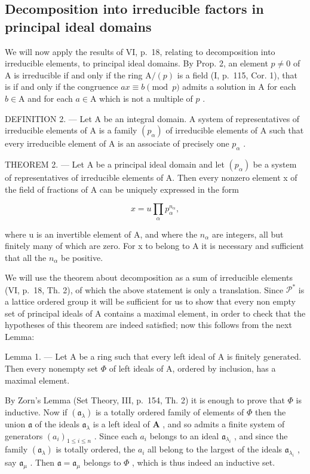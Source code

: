 \subsection{Decomposition into irreducible factors in principal ideal domains}

We will now apply the results of VI, p.~18, relating to decomposition into irreducible elements, to principal ideal domains. By Prop. 2, an element \(p \neq 0\) of A is irreducible if and only if the ring \(\mathrm{A}/(p)\) is a field (I, p.~115, Cor. 1), that is if and only if the congruence \(ax \equiv b \pmod{p}\) admits a solution in A for each \(b \in \mathrm{A}\) and for each \(a \in \mathrm{A}\) which is not a multiple of \(p\) .

DEFINITION 2. --- Let A be an integral domain. A system of representatives of irreducible elements of A is a family \((p_{\alpha})\) of irreducible elements of A such that every irreducible element of A is an associate of precisely one \(p_{\alpha}\) .

THEOREM 2. --- Let A be a principal ideal domain and let \((p_{\alpha})\) be a system of representatives of irreducible elements of A. Then every nonzero element x of the field of fractions of A can be uniquely expressed in the form

\[
x = u \prod_ {\alpha} p _ {\alpha} ^ {n _ {\alpha}},\tag{1}
\]

where u is an invertible element of A, and where the \(n_{\alpha}\) are integers, all but finitely many of which are zero. For x to belong to A it is necessary and sufficient that all the \(n_{\alpha}\) be positive.

We will use the theorem about decomposition as a sum of irreducible elements (VI, p.~18, Th. 2), of which the above statement is only a translation. Since \(\mathcal{P}^*\) is a lattice ordered group it will be sufficient for us to show that every non empty set of principal ideals of A contains a maximal element, in order to check that the hypotheses of this theorem are indeed satisfied; now this follows from the next Lemma:

Lemma 1. --- Let A be a ring such that every left ideal of A is finitely generated. Then every nonempty set \(\Phi\) of left ideals of A, ordered by inclusion, has a maximal element.

By Zorn's Lemma (Set Theory, III, p.~154, Th. 2) it is enough to prove that \(\Phi\) is inductive. Now if \((\mathfrak{a}_{\lambda})\) is a totally ordered family of elements of \(\Phi\) then the union \(\mathfrak{a}\) of the ideals \(\mathfrak{a}_{\lambda}\) is a left ideal of \(\mathbf{A}\) , and so admits a finite system of generators \((a_i)_{1 \leqslant i \leqslant n}\) . Since each \(a_i\) belongs to an ideal \(\mathfrak{a}_{\lambda_i}\) , and since the family \((\mathfrak{a}_{\lambda})\) is totally ordered, the \(a_i\) all belong to the largest of the ideals \(\mathfrak{a}_{\lambda_i}\) , say \(\mathfrak{a}_{\mu}\) . Then \(\mathfrak{a} = \mathfrak{a}_{\mu}\) belongs to \(\Phi\) , which is thus indeed an inductive set.

